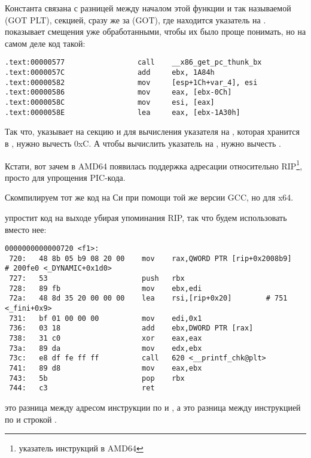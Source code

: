 Константа  связана с разницей между началом этой функции и так называемой
 (GOT PLT), секцией, сразу же за  (GOT), где находится указатель на \globvar{}.
\IDA показывает смещения уже обработанными, чтобы их было проще понимать, но на самом деле код такой:

\begin{lstlisting}[style=customasmx86]
.text:00000577                 call    __x86_get_pc_thunk_bx
.text:0000057C                 add     ebx, 1A84h
.text:00000582                 mov     [esp+1Ch+var_4], esi
.text:00000586                 mov     eax, [ebx-0Ch]
.text:0000058C                 mov     esi, [eax]
.text:0000058E                 lea     eax, [ebx-1A30h]
\end{lstlisting}

Так что, \EBX указывает на секцию  и для вычисления указателя на \globvar{}, которая хранится в , нужно вычесть 0xC.
А чтобы вычислить указатель на \retstring{}, нужно вычесть .

Кстати, вот зачем в AMD64 появилась поддержка адресации относительно RIP\footnote{указатель инструкций в AMD64}, просто для упрощения PIC-кода.

Скомпилируем тот же код на Си при помощи той же версии GCC, но для x64.

\IDA упростит код на выходе убирая упоминания RIP, так что будем использовать  вместо нее:

\begin{lstlisting}[style=customasmx86]
0000000000000720 <f1>:
 720:	48 8b 05 b9 08 20 00 	mov    rax,QWORD PTR [rip+0x2008b9]        # 200fe0 <_DYNAMIC+0x1d0>
 727:	53                   	push   rbx
 728:	89 fb                	mov    ebx,edi
 72a:	48 8d 35 20 00 00 00 	lea    rsi,[rip+0x20]        # 751 <_fini+0x9>
 731:	bf 01 00 00 00       	mov    edi,0x1
 736:	03 18                	add    ebx,DWORD PTR [rax]
 738:	31 c0                	xor    eax,eax
 73a:	89 da                	mov    edx,ebx
 73c:	e8 df fe ff ff       	call   620 <__printf_chk@plt>
 741:	89 d8                	mov    eax,ebx
 743:	5b                   	pop    rbx
 744:	c3                   	ret    
\end{lstlisting}

 это разница между адресом инструкции по  и \globvar{}, 
а  это разница между инструкцией по  и строкой \retstring{}.

